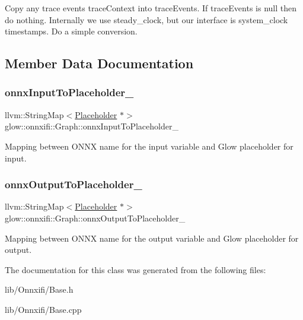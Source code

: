 Copy any trace events {\ttfamily trace\+Context} into {\ttfamily trace\+Events}. If {\ttfamily trace\+Events} is null then do nothing. Internally we use steady\+\_\+clock, but our interface is system\+\_\+clock timestamps. Do a simple conversion. 

\subsection{Member Data Documentation}
\mbox{\label{classglow_1_1onnxifi_1_1_graph_ab96d99570b4e9549fba9670b479223e6}} 
\subsubsection{\texorpdfstring{onnx\+Input\+To\+Placeholder\+\_\+}{onnxInputToPlaceholder\_}}
{\footnotesize\ttfamily llvm\+::\+String\+Map$<$\hyperlink{classglow_1_1_placeholder}{Placeholder} $\ast$$>$ glow\+::onnxifi\+::\+Graph\+::onnx\+Input\+To\+Placeholder\+\_\+\hspace{0.3cm}{\ttfamily [protected]}}

Mapping between O\+N\+NX name for the input variable and Glow placeholder for input. \mbox{\label{classglow_1_1onnxifi_1_1_graph_a624dc38c4ec10e3314425eb8155114b8}} 
\subsubsection{\texorpdfstring{onnx\+Output\+To\+Placeholder\+\_\+}{onnxOutputToPlaceholder\_}}
{\footnotesize\ttfamily llvm\+::\+String\+Map$<$\hyperlink{classglow_1_1_placeholder}{Placeholder} $\ast$$>$ glow\+::onnxifi\+::\+Graph\+::onnx\+Output\+To\+Placeholder\+\_\+\hspace{0.3cm}{\ttfamily [protected]}}

Mapping between O\+N\+NX name for the output variable and Glow placeholder for output. 

The documentation for this class was generated from the following files\+:\begin{DoxyCompactItemize}
\item 
lib/\+Onnxifi/Base.\+h\item 
lib/\+Onnxifi/Base.\+cpp\end{DoxyCompactItemize}
